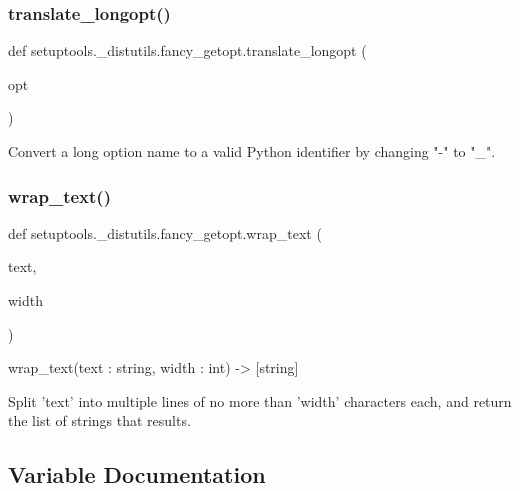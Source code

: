 \subsubsection{\texorpdfstring{translate\+\_\+longopt()}{translate\_longopt()}}
{\footnotesize\ttfamily def setuptools.\+\_\+distutils.\+fancy\+\_\+getopt.\+translate\+\_\+longopt (\begin{DoxyParamCaption}\item[{}]{opt }\end{DoxyParamCaption})}

\begin{DoxyVerb}Convert a long option name to a valid Python identifier by
changing "-" to "_".
\end{DoxyVerb}
 \mbox{\label{namespacesetuptools_1_1__distutils_1_1fancy__getopt_aa01c8d3e0a2fd41fefc32875efe1215a}} 
\subsubsection{\texorpdfstring{wrap\+\_\+text()}{wrap\_text()}}
{\footnotesize\ttfamily def setuptools.\+\_\+distutils.\+fancy\+\_\+getopt.\+wrap\+\_\+text (\begin{DoxyParamCaption}\item[{}]{text,  }\item[{}]{width }\end{DoxyParamCaption})}

\begin{DoxyVerb}wrap_text(text : string, width : int) -> [string]

Split 'text' into multiple lines of no more than 'width' characters
each, and return the list of strings that results.
\end{DoxyVerb}
 

\subsection{Variable Documentation}
\mbox{\label{namespacesetuptools_1_1__distutils_1_1fancy__getopt_a9a9f87aab18fe599747558a58737c190}} 
